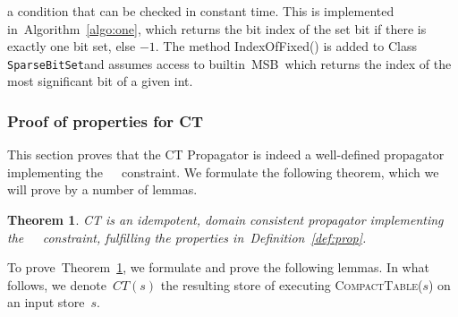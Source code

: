 \documentclass[a4paper,11pt]{article}
\newtheorem{theorem}{Theorem}[section]
\newcommand{\Algoref}[1]{Algorithm~\ref{#1}}
\newcommand{\Table}{\Constraint{Table}~}
\newcommand{\Defref}[1]{Definition~\ref{#1}}
\newcommand{\Thmref}[1]{Theorem~\ref{#1}}
\newcommand{\SparseBitSet}{\texttt{SparseBitSet}}
\def\CompactTable{\textsc{CompactTable}}
\def\FixDomains{\textsc{FixDomains}}
\numberwithin{equation}{section}
\begin{document}
\begin{description}
\noindent
a condition that can be checked in constant time.
This is implemented in~\Algoref{algo:one}, which returns
the bit index of the set bit if there is exactly one bit set, else $-1$.
The method IndexOfFixed() is added to Class \SparseBitSet and assumes access to
builtin~\textsc{MSB}~which returns the index of the most significant bit of a given int.

\begin{algorithm}[H]
  \begin{algorithmic}[1]  %
    
  \end{algorithmic}
  \caption{Checking if exactly one bit is set in \SparseBitSet.}
  \label{algo:one}
\end{algorithm}

\end{description}

%     

\subsubsection{Proof of properties for CT}
\label{sec:proof}

This section proves that the CT Propagator is indeed a well-defined propagator
implementing the~\Table~constraint. We formulate the following theorem, which
we will prove by a number of lemmas.

\begin{theorem} \label{thm:prop}
  CT is an idempotent, domain consistent propagator implementing 
  the~\Table~constraint, fulfilling the properties in~\Defref{def:prop}.
\end{theorem}

To prove~\Thmref{thm:prop}, we formulate and prove the following lemmas.
In what follows, we denote~$CT(s)$ the resulting store of executing
\CompactTable($s$) on an input store~$s$.
\end{document}
